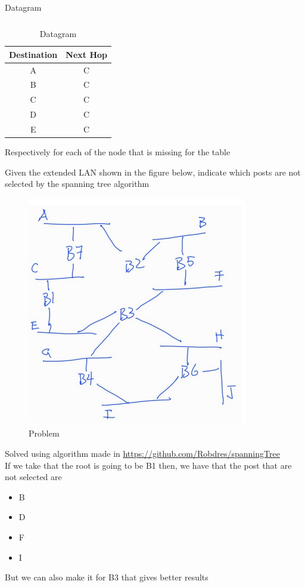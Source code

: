 \documentclass{assignment}
\begin{document}
\begin{table}[h]
\begin{tabular}{|c|c|}
\end{tabular}
\begin{tabular}{|c|c|} \hline
Destination  &  Next Hop \\ \hline
A&  C\\
B&  C\\
C&  C\\
D&  C\\
E&  C\\ \hline
\end{tabular}
\caption{Datagram}
\label{tab:six_tables}
\end{table}
Respectively for each of the node that is missing for the table
\newpage
\begin{ex}
  Given the extended LAN shown in the figure below, indicate which posts are not selected by
the spanning tree algorithm
\end{ex}
\begin{figure}[h]
\begin{center}
  \includegraphics[scale=0.5]{figures/2_000.png}
\end{center}
\caption{Problem}
\label{fig:probelm}
\end{figure}
Solved using algorithm made in \url{https://github.com/Robdres/spanningTree}\\
If we take that the root is going to be B1 then, we have that the post that are
not selected are
\begin{itemize}
  \item B
  \item D
  \item F
  \item I 
\end{itemize}
But we can also make it for B3 that gives better results
\end{document}
